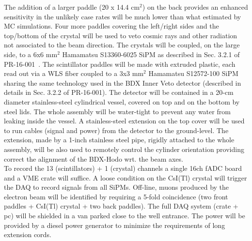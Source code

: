 The addition of a larger paddle (20 x 14.4 cm$^2$) on the back provides an enhanced sensitivity   in the unlikely  case rates will be much lower than what estimated by MC simulations.
Four more  paddles covering  the left/right sides and the top/bottom of the crystal will be used to veto cosmic rays and other radiation not associated to the beam direction.
The crystals will be coupled, on the large side,  to a 6x6 mm$^2$ Hamamatsu S13360-6025 SiPM as described in Sec. 3.2.1 of  PR-16-001~\cite{bdx-proposal}. The scintillator paddles will be  made with extruded plastic, each  read out via a WLS fiber coupled to a 3x3 mm$^2$ Hamamatsu S12572-100 SiPM sharing the same technology used in the BDX Inner Veto detector (described in details in Sec. 3.2.2 of  PR-16-001).
The detector will be contained  in a 20-cm diameter stainless-steel cylindrical vessel, covered on top and on the bottom by steel lids. The whole assembly will  be water-tight to prevent any water from leaking inside the vessel. A stainless-steel  extension on the top cover will be used  to run  cables (signal and power)  from the detector to the ground-level. The extension, made by a 1-inch stainless steel pipe,  rigidly attached to the whole assembly, will be also used  to remotely control the cylinder orientation  providing correct  the alignment of the BDX-Hodo wrt. the beam axes. \\
To record the 13 (scintillators) + 1 (crystal) channels a  single 16ch  fADC board and  a VME crate will suffice.
A loose condition  on the CsI(Tl) crystal will trigger the DAQ to record signals from all SiPMs.
Off-line, muons produced by the electron beam will be identified by requiring a 5-fold coincidence (two front paddles + CsI(Tl) crystal + two back  paddles).
The full DAQ system (crate + pc)  will be shielded in a van parked close to the well entrance. The power will be provided by a diesel power generator to minimize the requirements of long extension cords.

